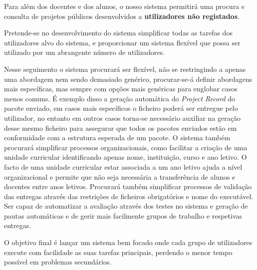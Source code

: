 Para além dos docentes e dos alunos, o nosso sistema permitirá uma procura e consulta de projetos públicos desenvolvidos a \textbf{utilizadores não registados}.

Pretende-se no desenvolvimento do sistema simplificar todas as tarefas dos utilizadores alvo do sistema, e proporcionar um sistema flexível que possa ser utilizado por um abrangente número de utilizadores.

Nesse seguimento o sistema procurará ser flexível, não se restringindo a apenas uma abordagem nem sendo demasiado genérico, procurar-se-á definir abordagens mais específicas, mas sempre com opções mais genéricas para englobar casos menos comuns. É exemplo disso a geração automática do \textit{Project Record} do pacote enviado, em casos mais específicos o ficheiro poderá ser entregue pelo utilizador, no entanto em outros casos torna-se necessário auxiliar na geração desse mesmo ficheiro para assegurar que todos os pacotes enviados estão em conformidade com a estrutura esperada de um pacote. O sistema também procurará simplificar processos organizacionais, como facilitar a criação de uma unidade curricular identificando apenas nome, instituição, curso e ano letivo. O facto de uma unidade curricular estar associada a um ano letivo ajuda a nível organizacional e permite que não seja necessária a transferência de alunos e docentes entre anos letivos. Procurará também simplificar processos de validação das entregas através das restrições de ficheiros obrigatórios e nome do executável. Ser capaz de automatizar a avaliação através dos testes no sistema e geração de pautas automáticas e de gerir mais facilmente grupos de trabalho e respetivas entregas.

O objetivo final é lançar um sistema bem focado onde cada grupo de utilizadores execute com facilidade as suas tarefas principais, perdendo o menor tempo possível em problemas secundários.

\newpage
